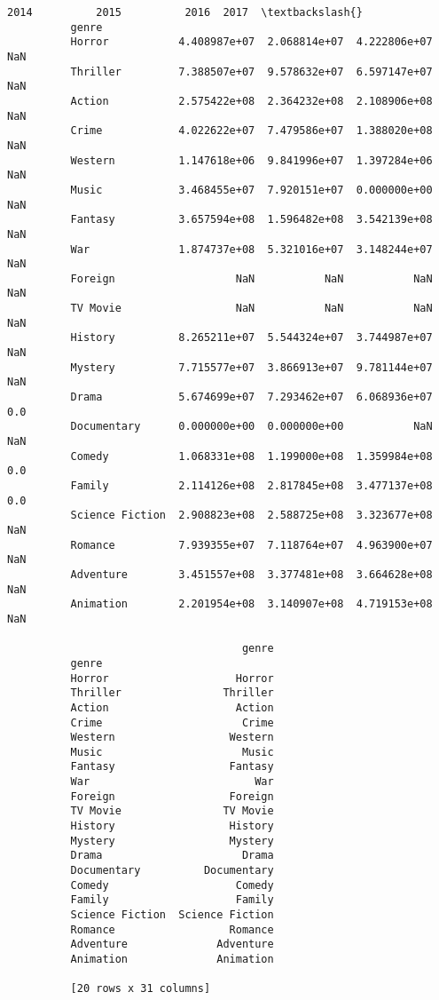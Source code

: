 \documentclass[11pt]{article}
\begin{document}
\begin{Verbatim}[commandchars=\\\{\}]
                                   2014          2015          2016  2017  \textbackslash{}
          genre                                                             
          Horror           4.408987e+07  2.068814e+07  4.222806e+07   NaN   
          Thriller         7.388507e+07  9.578632e+07  6.597147e+07   NaN   
          Action           2.575422e+08  2.364232e+08  2.108906e+08   NaN   
          Crime            4.022622e+07  7.479586e+07  1.388020e+08   NaN   
          Western          1.147618e+06  9.841996e+07  1.397284e+06   NaN   
          Music            3.468455e+07  7.920151e+07  0.000000e+00   NaN   
          Fantasy          3.657594e+08  1.596482e+08  3.542139e+08   NaN   
          War              1.874737e+08  5.321016e+07  3.148244e+07   NaN   
          Foreign                   NaN           NaN           NaN   NaN   
          TV Movie                  NaN           NaN           NaN   NaN   
          History          8.265211e+07  5.544324e+07  3.744987e+07   NaN   
          Mystery          7.715577e+07  3.866913e+07  9.781144e+07   NaN   
          Drama            5.674699e+07  7.293462e+07  6.068936e+07   0.0   
          Documentary      0.000000e+00  0.000000e+00           NaN   NaN   
          Comedy           1.068331e+08  1.199000e+08  1.359984e+08   0.0   
          Family           2.114126e+08  2.817845e+08  3.477137e+08   0.0   
          Science Fiction  2.908823e+08  2.588725e+08  3.323677e+08   NaN   
          Romance          7.939355e+07  7.118764e+07  4.963900e+07   NaN   
          Adventure        3.451557e+08  3.377481e+08  3.664628e+08   NaN   
          Animation        2.201954e+08  3.140907e+08  4.719153e+08   NaN   
          
                                     genre  
          genre                             
          Horror                    Horror  
          Thriller                Thriller  
          Action                    Action  
          Crime                      Crime  
          Western                  Western  
          Music                      Music  
          Fantasy                  Fantasy  
          War                          War  
          Foreign                  Foreign  
          TV Movie                TV Movie  
          History                  History  
          Mystery                  Mystery  
          Drama                      Drama  
          Documentary          Documentary  
          Comedy                    Comedy  
          Family                    Family  
          Science Fiction  Science Fiction  
          Romance                  Romance  
          Adventure              Adventure  
          Animation              Animation  
          
          [20 rows x 31 columns]
\end{Verbatim}
            
\end{document}
